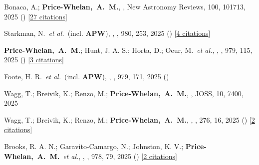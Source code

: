 \item[{\color{deemph}\scriptsize139}]Bonaca, A.; \textbf{Price-Whelan,~A.~M.}, , New Astronomy Reviews, 100, 101713, 2025 () [\href{http://adsabs.harvard.edu/abs/2025NewAR.10001713B}{27 citations}]

\item[{\color{deemph}\scriptsize138}]Starkman, N.~\textit{et al.}~(incl. \textbf{APW}), , \apj, 980, 253, 2025 () [\href{http://adsabs.harvard.edu/abs/2025ApJ...980..253S}{4 citations}]

\item[{\color{deemph}\scriptsize137}]\textbf{Price-Whelan,~A.~M.}; Hunt, J. A. S.; Horta, D.; Oeur, M.~\textit{et al.}, , \apj, 979, 115, 2025 () [\href{http://adsabs.harvard.edu/abs/2025ApJ...979..115P}{3 citations}]

\item[{\color{deemph}\scriptsize136}]Foote, H. R.~\textit{et al.}~(incl. \textbf{APW}), , \apj, 979, 171, 2025 ()

\item[{\color{deemph}\scriptsize135}]Wagg, T.; Breivik, K.; Renzo, M.; \textbf{Price-Whelan,~A.~M.}, , JOSS, 10, 7400, 2025

\item[{\color{deemph}\scriptsize134}]Wagg, T.; Breivik, K.; Renzo, M.; \textbf{Price-Whelan,~A.~M.}, , \apjs, 276, 16, 2025 () [\href{http://adsabs.harvard.edu/abs/2025ApJS..276...16W}{2 citations}]

\item[{\color{deemph}\scriptsize133}]Brooks, R. A. N.; Garavito-Camargo, N.; Johnston, K. V.; \textbf{Price-Whelan,~A.~M.}~\textit{et al.}, , \apj, 978, 79, 2025 () [\href{http://adsabs.harvard.edu/abs/2025ApJ...978...79B}{2 citations}]

